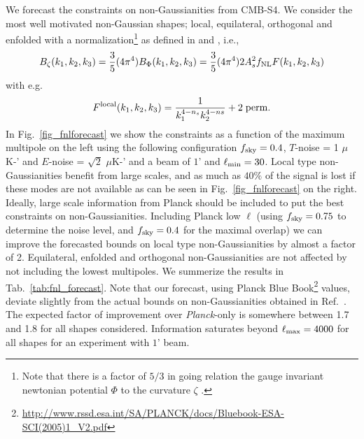 We forecast the constraints on non-Gaussianities from CMB-S4. We consider the most well motivated non-Gaussian shapes; local, equilateral, orthogonal and enfolded with a normalization\footnote{Note that there is a factor of $5/3$ in going relation the gauge invariant newtonian potential $\Phi$ to the curvature $\zeta$ \cite{Maldacena:2002vr}. } as defined in \cite{Babich:2004gb} and \cite{planck13-24}, i.e., 
\begin{equation}
B_{\zeta}(k_1,k_2,k_3) = \frac{3}{5} (4 \pi^4) B_{\Phi} (k_1,k_2,k_3) = \frac{3}{5} (4 \pi^4) 2 A_s^2 f_{\rm NL} F(k_1,k_2,k_3) 
\end{equation}
with e.g. 
\begin{equation}
F^{\rm local}(k_1,k_2,k_3) = \frac{1}{k_1^{4-n_s}k_2^{4-ns}} + {\rm 2\;perm.}
\end{equation}
In Fig.~\ref{fig_fnlforecast} we show the constraints as a function of the maximum multipole on the left using the following configuration $f_{\rm sky} = 0.4$, $T$-noise = 1 $\mu$K-' and $E$-noise = $\sqrt{2}$ $\mu$K-' and a beam of $1$' and $\ell_{\rm min} = 30$. Local type non-Gaussianities benefit from large scales, and as much as $40\%$ of the signal is lost if these modes are not available as can be seen in Fig.~\ref{fig_fnlforecast} on the right. Ideally, large scale information from Planck \cite{Ade:2015ava} should be included to put the best constraints on non-Gaussianities. Including Planck low $\ell$ (using $f_{\rm sky} = 0.75$ \cite{Ade:2015ava} to determine the noise level, and $f_{\rm sky}=0.4$ for the maximal overlap) we can improve the forecasted bounds on local type non-Gaussianities by almost a factor of 2. Equilateral, enfolded and orthogonal non-Gaussianities are not affected by not including the lowest multipoles. We summerize the results in Tab.~\ref{tab:fnl_forecast}. Note that our forecast, using Planck Blue Book\footnote{\url{http://www.rssd.esa.int/SA/PLANCK/docs/Bluebook-ESA-SCI(2005)1_V2.pdf}} values, deviate slightly from the actual bounds on non-Gaussianities obtained in Ref.~\cite{Ade:2015ava}. The expected factor of improvement over {\it Planck}-only is somewhere between 1.7 and 1.8 for all shapes considered. Information saturates beyond $\ell_{\rm max} = 4000$ for all shapes for an experiment with $1$' beam. 

